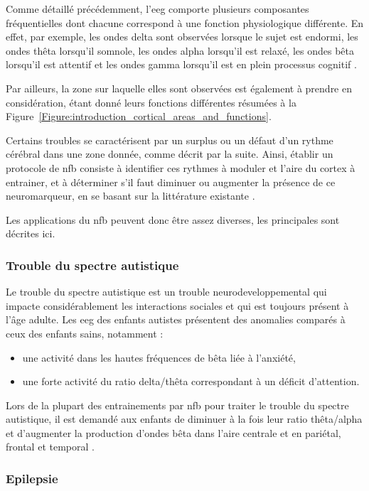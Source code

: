 Comme détaillé précédemment, l'\gls{eeg} comporte plusieurs composantes fréquentielles dont chacune correspond à une fonction physiologique différente.
En effet, par exemple, les ondes delta sont observées lorsque le sujet est endormi, les ondes thêta lorsqu'il somnole, les ondes alpha lorsqu'il est relaxé, 
les ondes bêta lorsqu'il est attentif et les ondes gamma lorsqu'il est en plein processus cognitif \citep{Marzbani2016}. 

Par ailleurs, la zone sur laquelle elles sont observées est également à prendre en considération, étant donné leurs fonctions différentes résumées
à la Figure~\ref{Figure:introduction_cortical_areas_and_functions}.

Certains troubles se caractérisent par un surplus ou un défaut d'un rythme cérébral dans une zone donnée, comme décrit par la suite. 
Ainsi, établir un protocole de \gls{nfb} consiste à identifier ces rythmes à moduler et l'aire 
du cortex à entrainer, et à déterminer s'il faut diminuer ou augmenter la présence de ce neuromarqueur, en se basant sur la littérature 
existante \citep{Micoulaud2019}.

Les applications du \gls{nfb} peuvent donc être assez diverses, les principales sont décrites ici. 

\subsubsection{Trouble du spectre autistique}

Le trouble du spectre autistique est un trouble neurodeveloppemental qui impacte considérablement les interactions sociales et qui est toujours présent à 
l'âge adulte. Les \gls{eeg} des enfants autistes présentent des anomalies comparés à ceux des enfants sains, notamment \citep{Coben2010, Kouijzer2010} :
\begin{itemize}
\item une activité dans les hautes fréquences de bêta liée à l'anxiété,
\item une forte activité du ratio delta/thêta correspondant à un déficit d'attention.
\end{itemize}
Lors de la plupart des entrainements par \gls{nfb} pour traiter le trouble du spectre autistique, il est demandé aux enfants de diminuer à la fois leur ratio 
thêta/alpha et d'augmenter la production d'ondes bêta dans l'aire centrale \citep{Thompson2010} et en pariétal, frontal et temporal \citep{Othmer2007}. 

\subsubsection{Epilepsie}


